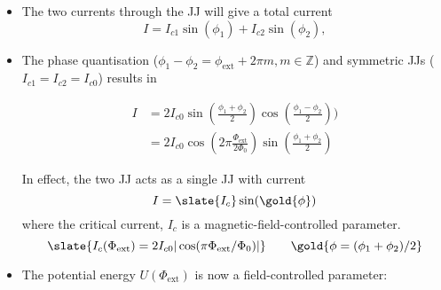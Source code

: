 \begin{itemize}
\item   The  two   currents   through   the  JJ   will   give  a   total
  current \begin{equation} I = I_{c1}\sin(\phi_1)+I_{c2}\sin(\phi_2),
  \end{equation}

\item                The               phase                quantisation
  ($ \phi_1-\phi_2 =  \phi_\text{ext} + 2\pi m, m \in  \mathbb{Z} $) and
  symmetric JJs ($I_{c1}=I_{c2}=I_{c0}$) results in

  \begin{equation}
    \begin{aligned}
      I & = 2I_{c0}\sin(\frac{\phi_1+\phi_2}{2})\cos(\frac{\phi_1-\phi_2}{2})) \\
      &                                                                =
      2I_{c0}\cos(2\pi\frac{\Phi_{\text{ext}}}{2\Phi_0})\sin(\frac{\phi_1+\phi_2}{2})
    \end{aligned}
  \end{equation}

\begin{framed}\noindent
  In effect, the two JJ acts as a single JJ with current
  \begin{equation}
    I = \slate{I_{c}}\sin(\gold{\phi})
  \end{equation}
  \noindent    where    the    critical     current,    $I_c$    is    a
  magnetic-field-controlled parameter.
  \begin{equation}
    \slate{I_{c}(\Phi_\text{ext}) = 2I_{c0}|\cos(\pi\Phi_\text{ext}/\Phi_0)|} \qquad \gold{\phi = (\phi_1+\phi_2)/2}
  \end{equation}

\end{framed}

\item   The   potential   energy   $U(\Phi_{\text{ext}})$   is   now   a
  field-controlled parameter:


\end{itemize}
